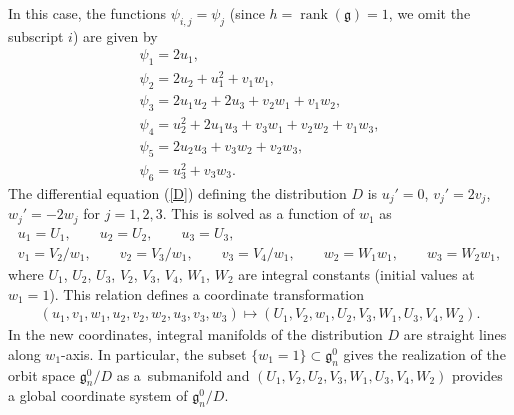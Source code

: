 \documentclass[10pt,a4paper]{amsart}
\numberwithin{equation}{section}
\begin{document}
 In this case, the functions $\psi _{i,j} = \psi _j$ (since $h=\operatorname{rank}(\mathfrak{g}) = 1$, we omit the subscript $i$) are given by
\begin{gather*}
\psi _1 = 2u_1, \\
\psi _2 = 2u_2 + u_1^2 + v_1w_1, \\
\psi _3 = 2u_1u_2 + 2u_3 + v_2w_1 + v_1w_2,\\
\psi _4 = u_2^2 + 2u_1u_3 + v_3w_1 + v_2w_2 + v_1w_3, \\
\psi_5 = 2u_2u_3+v_3w_2+v_2w_3, \\
\psi_6 = u_3^2 + v_3w_3.
\end{gather*}
The dif\/ferential equation (\ref{D}) def\/ining the distribution $D$ is $u_j' = 0$, $ v_j' = 2v_j$, $ w_j' = -2w_j$ for $j=1,2,3$. This is solved as a function of $w_1$ as
\begin{gather*}
 u_1 = U_1, \qquad u_2 = U_2,\qquad u_3= U_3, \\
 v_1 = V_2/w_1,\qquad v_2 = V_3/w_1,\qquad v_3 = V_4/w_1,\qquad w_2 = W_1 w_1,\qquad w_3 = W_2w_1,
\end{gather*}
where $U_1$, $U_2$, $ U_3$, $V_2$, $V_3$, $V_4$, $W_1$, $W_2$ are integral constants (initial values at $w_1 = 1$). This relation def\/ines a coordinate transformation
\begin{gather*}
(u_1, v_1, w_1, u_2, v_2, w_2, u_3, v_3, w_3) \mapsto (U_1, V_2, w_1, U_2, V_3, W_1, U_3, V_4, W_2).
\end{gather*}
In the new coordinates, integral manifolds of the distribution $D$ are straight lines along $w_1$-axis. In particular, the subset $\{ w_1 = 1\} \subset \mathfrak{g}^0_n$ gives the realization of the orbit space $\mathfrak{g}^0_n/D$ as a~submanifold and $(U_1, V_2, U_2, V_3, W_1, U_3, V_4, W_2)$ provides a global coordinate system of $\mathfrak{g}^0_n/D$.
\end{document}

